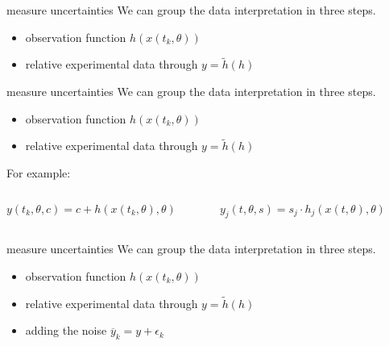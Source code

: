 \documentclass{beamer}
\begin{document}
  	\begin{frame}{measure uncertainties}
    	We can group the data interpretation in three steps.
    	\begin{itemize}
    		\item observation function $h(x(t_k,\theta))$
    		\item relative experimental data through $y = \tilde{h}(h)$
    	\end{itemize}
  	\end{frame}
  	
  	\begin{frame}{measure uncertainties}
    	We can group the data interpretation in three steps.
    	\begin{itemize}
    		\item observation function $h(x(t_k,\theta))$
    		\item relative experimental data through $y = \tilde{h}(h)$
    	\end{itemize}
    	For example:
    	\vspace{0.7cm}
    	\begin{columns}
  			\begin{column}{5cm}
  				$y(t_k,\theta,c) = c + h(x(t_k,\theta),\theta)$
  			\end{column}
  			\begin{column}{5cm}
 				$y_{j}(t,\theta,s) = s_{j} \cdot h_{j}(x(t,\theta),\theta)$
  			\end{column}
  		\end{columns}
  	\end{frame}  	
  	
  	\begin{frame}{measure uncertainties}
    	We can group the data interpretation in three steps.
    	\begin{itemize}
    		\item observation function $h(x(t_k,\theta))$
    		\item relative experimental data through $y = \tilde{h}(h)$
    		\item adding the noise $\overline{y}_{k} = y + \epsilon_{k}$
    	\end{itemize}
  	\end{frame}
  	
\end{document}
